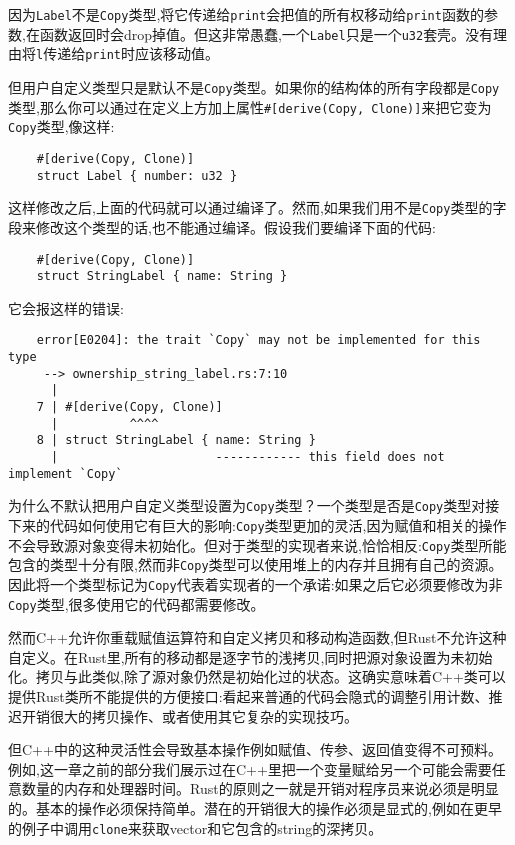 因为\texttt{Label}不是\texttt{Copy}类型,将它传递给\texttt{print}会把值的所有权移动给\texttt{print}函数的参数,在函数返回时会drop掉值。但这非常愚蠢,一个\texttt{Label}只是一个\texttt{u32}套壳。没有理由将\texttt{l}传递给\texttt{print}时应该移动值。

但用户自定义类型只是默认不是\texttt{Copy}类型。如果你的结构体的所有字段都是\texttt{Copy}类型,那么你可以通过在定义上方加上属性\texttt{\#[derive(Copy, Clone)]}来把它变为\texttt{Copy}类型,像这样:
\begin{verbatim}
    #[derive(Copy, Clone)]
    struct Label { number: u32 }
\end{verbatim}

这样修改之后,上面的代码就可以通过编译了。然而,如果我们用不是\texttt{Copy}类型的字段来修改这个类型的话,也不能通过编译。假设我们要编译下面的代码:
\begin{verbatim}
    #[derive(Copy, Clone)]
    struct StringLabel { name: String }
\end{verbatim}

它会报这样的错误:
\begin{verbatim}
    error[E0204]: the trait `Copy` may not be implemented for this type
     --> ownership_string_label.rs:7:10
      |
    7 | #[derive(Copy, Clone)]
      |          ^^^^
    8 | struct StringLabel { name: String }
      |                      ------------ this field does not implement `Copy`
\end{verbatim}

为什么不默认把用户自定义类型设置为\texttt{Copy}类型？一个类型是否是\texttt{Copy}类型对接下来的代码如何使用它有巨大的影响:\texttt{Copy}类型更加的灵活,因为赋值和相关的操作不会导致源对象变得未初始化。但对于类型的实现者来说,恰恰相反:\texttt{Copy}类型所能包含的类型十分有限,然而非\texttt{Copy}类型可以使用堆上的内存并且拥有自己的资源。因此将一个类型标记为\texttt{Copy}代表着实现者的一个承诺:如果之后它必须要修改为非\texttt{Copy}类型,很多使用它的代码都需要修改。

然而C++允许你重载赋值运算符和自定义拷贝和移动构造函数,但Rust不允许这种自定义。在Rust里,所有的移动都是逐字节的浅拷贝,同时把源对象设置为未初始化。拷贝与此类似,除了源对象仍然是初始化过的状态。这确实意味着C++类可以提供Rust类所不能提供的方便接口:看起来普通的代码会隐式的调整引用计数、推迟开销很大的拷贝操作、或者使用其它复杂的实现技巧。

但C++中的这种灵活性会导致基本操作例如赋值、传参、返回值变得不可预料。例如,这一章之前的部分我们展示过在C++里把一个变量赋给另一个可能会需要任意数量的内存和处理器时间。Rust的原则之一就是开销对程序员来说必须是明显的。基本的操作必须保持简单。潜在的开销很大的操作必须是显式的,例如在更早的例子中调用\texttt{clone}来获取vector和它包含的string的深拷贝。

